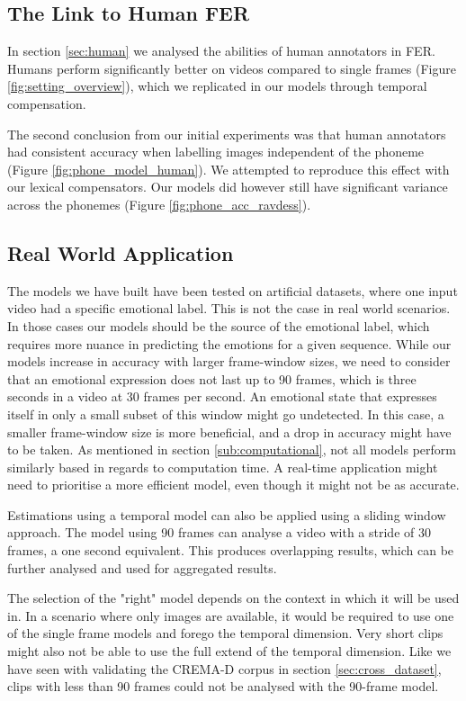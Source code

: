 \subsection{The Link to Human FER}
In section \ref{sec:human} we analysed the abilities of human annotators in FER. Humans perform significantly better on videos compared to single frames (Figure \ref{fig:setting_overview}), which we replicated in our models through temporal compensation.

The second conclusion from our initial experiments was that human annotators had consistent accuracy when labelling images independent of the phoneme (Figure \ref{fig:phone_model_human}). We attempted to reproduce this effect with our lexical compensators. Our models did however still have significant variance across the phonemes (Figure \ref{fig:phone_acc_ravdess}).

\subsection{Real World Application}
The models we have built have been tested on artificial datasets, where one input video had a specific emotional label. This is not the case in real world scenarios. In those cases our models should be the source of the emotional label, which requires more nuance in predicting the emotions for a given sequence. While our models increase in accuracy with larger frame-window sizes, we need to consider that an emotional expression does not last up to 90 frames, which is three seconds in a video at 30 frames per second. An emotional state that expresses itself in only a small subset of this window might go undetected. In this case, a smaller frame-window size is more beneficial, and a drop in accuracy might have to be taken. As mentioned in section  \ref{sub:computational}, not all models perform similarly based in regards to computation time. A real-time application might need to prioritise a more efficient model, even though it might not be as accurate.

Estimations using a temporal model can also be applied using a sliding window approach. The model using 90 frames can analyse a video with a stride of 30 frames, a one second equivalent. This produces overlapping results, which can be further analysed and used for aggregated results.

The selection of the "right" model depends on the context in which it will be used in. In a scenario where only images are available, it would be required to use one of the single frame models and forego the temporal dimension. Very short clips might also not be able to use the full extend of the temporal dimension. Like we have seen with validating the CREMA-D corpus in section \ref{sec:cross_dataset}, clips with less than 90 frames could not be analysed with the 90-frame model.

